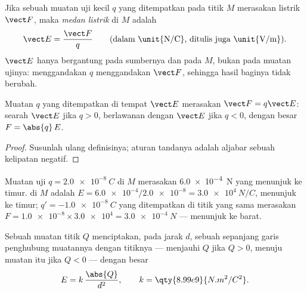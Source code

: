 \begin{definition}\label{def:g11:electric-gravitational-fields:efield}
Jika sebuah muatan uji kecil $q$ yang ditempatkan pada titik $M$
merasakan  listrik $\vect F$, maka \emph{medan
listrik} di $M$ adalah
\[
\vect E = \frac{\vect F}{q}
\qquad \text{(dalam \unit{N/C}, ditulis juga \unit{V/m})}.
\]
$\vect E$ hanya bergantung pada sumbernya dan pada $M$, bukan pada
muatan ujinya: menggandakan $q$ menggandakan $\vect F$, sehingga
hasil baginya tidak berubah.
\end{definition}

\begin{proposition}\label{prop:g11:electric-gravitational-fields:force}
Muatan $q$ yang ditempatkan di tempat  $\vect E$ merasakan 
$\vect F = q \vect E$: searah $\vect E$ jika $q > 0$, berlawanan dengan
$\vect E$ jika $q < 0$, dengan besar $F = \abs{q}\,E$.
\end{proposition}

\begin{proof}
Susunlah ulang definisinya; aturan tandanya adalah aljabar sebuah
kelipatan negatif.
\end{proof}

\begin{example}\label{ex:g11:electric-gravitational-fields:reading}
Muatan uji $q = \qty{+2.0e-8}{C}$ di $M$ merasakan 
\qty{6.0e-4}{N} yang menunjuk ke timur.  di $M$ adalah
$E = \num{6.0e-4} / \num{2.0e-8} = \qty{3.0e4}{N/C}$, menunjuk ke
timur; $q' = \qty{-1.0e-8}{C}$ yang ditempatkan di titik yang sama
merasakan $F = \num{1.0e-8} \times \num{3.0e4} = \qty{3.0e-4}{N}$ ---
menunjuk ke barat.
\end{example}

\begin{proposition}\label{prop:g11:electric-gravitational-fields:point}
Sebuah muatan titik $Q$ menciptakan, pada jarak $d$, sebuah 
sepanjang garis penghubung muatannya dengan titiknya --- menjauhi $Q$
jika $Q > 0$, menuju muatan itu jika $Q < 0$ --- dengan besar
\[
E = k\,\frac{\abs{Q}}{d^2},
\qquad k = \qty{8.99e9}{N.m^2/C^2}.
\]
\end{proposition}

